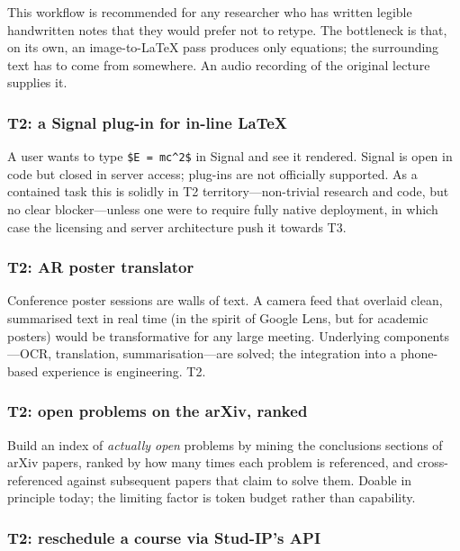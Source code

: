 \begin{remark}
  This workflow is recommended for any researcher who has
  written legible handwritten notes that they would prefer
  not to retype.  The bottleneck is that, on its own, an
  image-to-\LaTeX{} pass produces only equations; the
  surrounding text has to come from somewhere.  An audio
  recording of the original lecture supplies it.
\end{remark}

\subsubsection{T2: a Signal plug-in for in-line \LaTeX}

A user wants to type \verb|$E = mc^2$| in Signal and see it
rendered.  Signal is open in code but closed in server
access; plug-ins are not officially supported.  As a
contained task this is solidly in T2 territory---non-trivial
research and code, but no clear blocker---unless one were
to require fully native deployment, in which case the
licensing and server architecture push it towards T3.

\subsubsection{T2: AR poster translator}

Conference poster sessions are walls of text.  A camera
feed that overlaid clean, summarised text in real time
(in the spirit of Google Lens, but for academic posters)
would be transformative for any large meeting.  Underlying
components---OCR, translation, summarisation---are
solved; the integration into a phone-based experience is
engineering.  T2.

\subsubsection{T2: open problems on the arXiv, ranked}

Build an index of \emph{actually open} problems by mining
the conclusions sections of arXiv papers, ranked by how
many times each problem is referenced, and cross-referenced
against subsequent papers that claim to solve them.
Doable in principle today; the limiting factor is token
budget rather than capability.

\subsubsection{T2: reschedule a course via Stud-IP's API}

